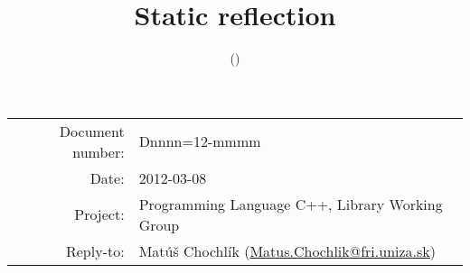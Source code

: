 \documentclass[11pt,a4paper,oneside]{article}
\title{Static reflection}
\author{\mchname (\mchmail)}
\makeatletter
\newcommand{\mchmail}{Matus.Chochlik@fri.uniza.sk}
\newcommand{\docnum}{Dnnnn=12-mmmm}
\newcommand{\docdate}{2012-03-08}
\makeatother
\begin{document}
\begin{tabular}{r l}
Document number: & \docnum\\
Date: & \docdate\\
Project: & Programming Language C++, Library Working Group \\
Reply-to: & Mat\'{u}\v{s} Chochl\'{i}k (\href{mailto:\mchmail}{\mchmail})\\
\end{tabular}


\tableofcontents








\end{document}
